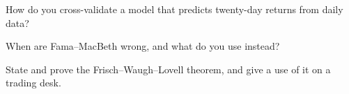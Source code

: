 \begin{interviewq}\label{iq:qm:linear-models-under-stress:4}
How do you cross-validate a model that predicts twenty-day returns from daily data?
\end{interviewq}

\begin{interviewq}\label{iq:qm:linear-models-under-stress:5}
When are Fama--MacBeth  wrong, and what do you use instead?
\end{interviewq}

\begin{interviewq}\label{iq:qm:linear-models-under-stress:6}
State and prove the Frisch--Waugh--Lovell theorem, and give a use of it on a trading desk.
\end{interviewq}
